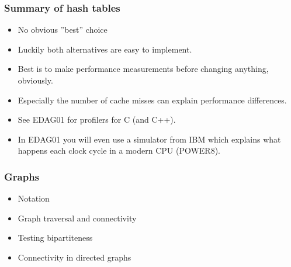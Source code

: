 \documentclass[trans]{beamer}
\newcommand{\cancel}[1]{}
\begin{document}
\begin{frame}[fragile=singleslide]
\frametitle{Summary of hash tables}
\begin{itemize}
\item No obvious ''best'' choice
\item Luckily both alternatives are easy to implement.
\item Best is to make performance measurements before changing anything, obviously. 
\item Especially the number of cache misses can explain performance differences.
\item See EDAG01 for profilers for C (and C++).
\item In EDAG01 you will even use a simulator from IBM which explains what happens each clock cycle in a modern CPU (POWER8).
\end{itemize}
\end{frame}
\cancel{

\subsection{\label{data.hash.summary.sec}Summary of hash tables}

Which hash table to use depends on the context but a clear advantage with
open addressing is much better locality of references which can lead to significantly better cache performance~\cite{cbook}.
Although it may appear to be simpler to use separate chaining, it can be more complicated to make efficient use of memory when
allocating and deallocating (or garbage collecting) the list nodes in separate chaining.
Assuming the cost of computing $h_2$ in double hashing is sufficiently low (which may be false), open 
addressing with double hashing
appears to be the most preferable hash table in a performance critical application, it is of course 
necessary to make performance measurements~\cite{cbook}. On the other hand, it is simpler to use separate chaining
and the performance may be sufficient.
}

\begin{frame}[fragile=singleslide]
\frametitle{Graphs}
\begin{itemize}
\item Notation
\item Graph traversal and connectivity
\item Testing bipartiteness
\item Connectivity in directed graphs
\end{itemize}
\end{frame}
\end{document}
